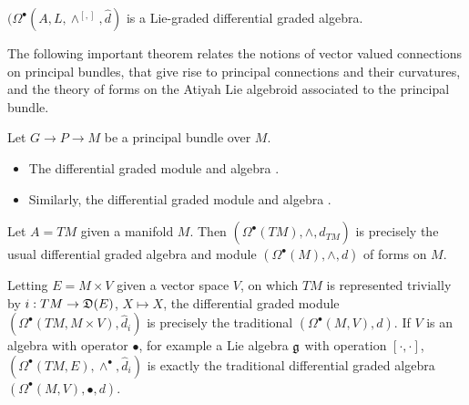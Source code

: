 \begin{example}
$(\Omega^\bullet(A, L, \wedge^{[,]}, \hat d)$ is a Lie-graded differential graded algebra.

\end{example}

\linea

The following important theorem relates the notions of vector valued connections on principal bundles, that give rise to principal connections and their curvatures, and the theory of forms on the Atiyah Lie algebroid associated to the principal bundle.

\begin{theorem}\label{theoFormsPpalAtiyahSame}
Let $G \to P \to M$ be a principal bundle over $M$. 
\begin{itemize}
    \item The differential graded module and algebra .
    
    \item Similarly, the differential graded module and algebra .
\end{itemize} 
\end{theorem}

\linea

\begin{example}
Let $A = TM$ given a manifold $M$. Then $(\Omega^\bullet (TM), \wedge, \hat d_{TM})$ is precisely the usual differential graded algebra and module $(\Omega^\bullet (M), \wedge, d)$ of forms on $M$.

Letting $E = M \times V$ given a vector space $V$, on which $TM$ is represented trivially by $i: TM \to \mathfrak{D}(E)$, $X \mapsto X$, the differential graded module $(\Omega^\bullet(TM, M \times V), \hat d_i)$ is precisely the traditional $(\Omega^\bullet(M, V), d)$. If $V$ is an algebra with operator $\bullet$, for example a Lie algebra $\mathfrak{g}$ with operation $[\cdot, \cdot]$, $(\Omega^\bullet(TM, E), \wedge^\bullet, \hat d_i)$ is exactly the traditional differential graded algebra $(\Omega^\bullet(M, V), \bullet, d)$.
\end{example}


